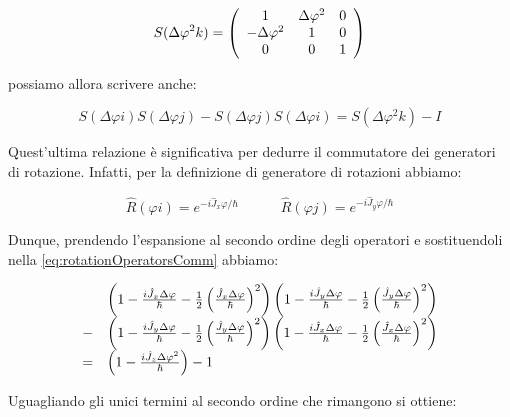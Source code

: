 	\begin{equation}
		S(\Delta \varphi^2 k) = 
		\left ( \begin{array}{c c c}
			1 & \Delta \varphi^2 & 0\\
			-\Delta \varphi^2 & 1 & 0 \\
			0 & 0 & 1 \\
		\end{array} \right )
	\end{equation}

possiamo allora scrivere anche:

	\begin{equation} \label{eq:rotationOperatorsComm}
		S(\Delta \varphi i) S(\Delta \varphi j) - S(\Delta \varphi j) S(\Delta \varphi i) = S(\Delta \varphi^2 k) - I
	\end{equation}

Quest'ultima relazione \`e significativa per dedurre il commutatore dei generatori di rotazione. Infatti, per la definizione di generatore di rotazioni abbiamo:

	\begin{equation}
		\hat{R} ( \varphi i ) = e^{-i \hat{J}_x \varphi / \hbar } \quad \quad
		\quad \hat{R} ( \varphi j ) = e^{-i \hat{J}_y \varphi / \hbar } 
	\end{equation}

Dunque, prendendo l'espansione al secondo ordine degli operatori e sostituendoli nella \eqref{eq:rotationOperatorsComm} abbiamo:

	\begin{equation}
		\begin{array}{r l}
		& \left ( 1 - \frac{i \hat{J}_x \Delta \varphi}{\hbar} - \frac{1}{2} \left ( \frac{\hat{J}_x \Delta \varphi}{\hbar} \right ) ^ 2 \right ) \left ( 1 - \frac{i \hat{J}_y \Delta \varphi}{\hbar} - \frac{1}{2} \left ( \frac{\hat{J}_y \Delta \varphi}{\hbar} \right ) ^ 2 \right ) \\
		- & \left ( 1 - \frac{i \hat{J}_y \Delta \varphi}{\hbar} - \frac{1}{2} \left ( \frac{\hat{J}_y \Delta \varphi}{\hbar} \right ) ^ 2 \right ) \left ( 1 - \frac{i \hat{J}_x \Delta \varphi}{\hbar} - \frac{1}{2} \left ( \frac{\hat{J}_x \Delta \varphi}{\hbar} \right ) ^ 2 \right ) \\ 
		= & \left ( 1 - \frac{i \hat{J}_z \Delta \varphi^2}{\hbar} \right ) - 1
		\end{array}
	\end{equation}

Uguagliando gli unici termini al secondo ordine che rimangono si ottiene:


